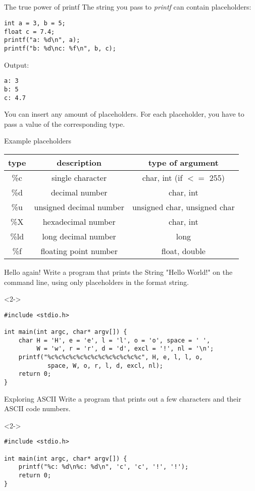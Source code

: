\subsection{}
\begin{frame}[fragile]{The true power of printf}
	The string you pass to \textit{printf} can contain placeholders:
	\begin{lstlisting}[numbers=none]
int a = 3, b = 5;
float c = 7.4;
printf("a: %d\n", a);
printf("b: %d\nc: %f\n", b, c);
\end{lstlisting}
Output:\begin{lstlisting}[numbers=none]
a: 3
b: 5
c: 4.7
\end{lstlisting}
You can insert any amount of placeholders. For each placeholder, you have to pass a value of the corresponding type.
\end{frame}
\begin{frame}{Example placeholders}
	\begin{tabular}{|c|c|c|}
		\hline
		\textbf{type} & \textbf{description} & \textbf{type of argument} \\\hline
		\%c & single character & char, int (if $<=$ 255) \\\hline
		\%d & decimal number & char, int \\\hline
		\%u & unsigned decimal number & unsigned char, unsigned char \\\hline
		\%X & hexadecimal number & char, int \\\hline
		\%ld & long decimal number & long \\\hline
		\%f & floating point number & float, double \\\hline
	\end{tabular}
\end{frame}
\begin{frame}[fragile]{Hello again!}
	Write a program that prints the String "Hello World!" on the command line, using only placeholders in the format string.
	\begin{uncoverenv}<2->
		\begin{lstlisting}
#include <stdio.h>

int main(int argc, char* argv[]) {
	char H = 'H', e = 'e', l = 'l', o = 'o', space = ' ',
		 W = 'w', r = 'r', d = 'd', excl = '!', nl = '\n';
	printf("%c%c%c%c%c%c%c%c%c%c%c%c%c", H, e, l, l, o,
			space, W, o, r, l, d, excl, nl);
	return 0;
}
\end{lstlisting}
	\end{uncoverenv}
\end{frame}
\begin{frame}[fragile]{Exploring ASCII}
	Write a program that prints out a few characters and their ASCII code numbers.
	\begin{uncoverenv}<2->
		\begin{lstlisting}
#include <stdio.h>

int main(int argc, char* argv[]) {
	printf("%c: %d\n%c: %d\n", 'c', 'c', '!', '!');
	return 0;
}
\end{lstlisting}
	\end{uncoverenv}
\end{frame}


